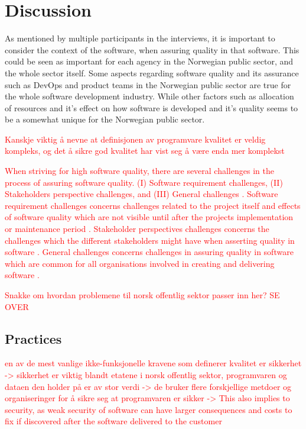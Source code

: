 \chapter{Discussion}
As mentioned by multiple participants in the interviews, it is important to consider the context of the software, when assuring quality in that software. This could be seen as important for each agency in the Norwegian public sector, and the whole sector itself. Some aspects regarding software quality and its assurance such as DevOps and product teams in the Norwegian public sector are true for the whole software development industry. While other factors such as allocation of resources and it's effect on how software is developed and it's quality seems to be a somewhat unique for the Norwegian public sector.

\textcolor{red}{Kanskje viktig å nevne at definisjonen av programvare kvalitet er veldig kompleks, og det å sikre god kvalitet har vist seg å være enda mer komplekst}

\textcolor{red}{When striving for high software quality, there are several challenges in the process of assuring software quality. (I) Software requirement challenges, (II) Stakeholders perspective challenges, and (III) General challenges \cite{sh_2018}. Software requirement challenges concerns challenges related to the project itself and effects of software quality which are not visible until after the projects implementation or maintenance period \cite{sh_2018}. Stakeholder perspectives challenges concerns the challenges which the different stakeholders might have when asserting quality in software \cite{sh_2018}. General challenges concerns challenges in assuring quality in software which are common for all organisations involved in creating and delivering software \cite{sh_2018}.}

\textcolor{red}{Snakke om hvordan problemene til norsk offentlig sektor passer inn her? SE OVER}

\section{Practices}
\textcolor{red}{en av de mest vanlige ikke-funksjonelle kravene som definerer kvalitet er sikkerhet -> sikkerhet er viktig blandt etatene i norsk offentlig sektor, programvaren og dataen den holder på er av stor verdi -> de bruker flere forskjellige metdoer og organiseringer for å sikre seg at programvaren er sikker -> This also implies to security, as weak security of software can have larger consequences and costs to fix if discovered after the software delivered to the customer \cite{csw_2011}}

